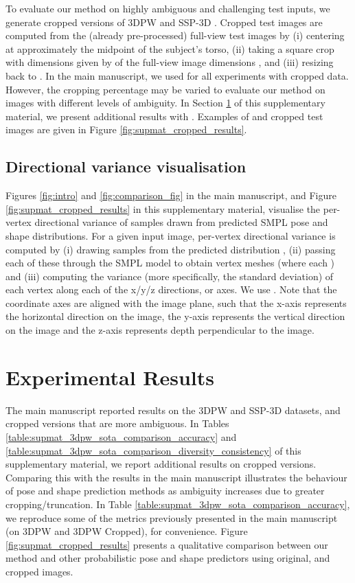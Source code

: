 To evaluate our method on highly ambiguous and challenging test inputs, we generate cropped versions of 3DPW \cite{vonMarcard2018} and SSP-3D \cite{STRAPS2020BMVC}. Cropped test images are computed from the (already pre-processed) full-view test images by (i) centering at approximately the midpoint of the subject's torso, (ii) taking a square crop with dimensions given by  of the full-view image dimensions , and (iii) resizing back to . In the main manuscript, we used  for all experiments with cropped data. However, the cropping percentage may be varied to evaluate our method on images with different levels of ambiguity. In Section \ref{sec:supmat_experiments} of this supplementary material, we present additional results with . Examples of  and  cropped test images are given in Figure \ref{fig:supmat_cropped_results}.

\subsection{Directional variance visualisation}

Figures \ref{fig:intro} and \ref{fig:comparison_fig} in the main manuscript, and Figure \ref{fig:supmat_cropped_results} in this supplementary material, visualise the per-vertex directional variance of samples drawn from predicted SMPL pose and shape distributions. For a given input image, per-vertex directional variance is computed by (i) drawing  samples from the predicted distribution , (ii) passing each of these through the SMPL \cite{SMPL:2015} model to obtain  vertex meshes  (where each ) and (iii) computing the variance (more specifically, the standard deviation) of each vertex along each of the x/y/z directions, or axes. We use . Note that the coordinate axes are aligned with the image plane, such that the x-axis represents the horizontal direction on the image, the y-axis represents the vertical direction on the image and the z-axis represents depth perpendicular to the image.


\section{Experimental Results}
\label{sec:supmat_experiments}

 The main manuscript reported results on the 3DPW \cite{vonMarcard2018} and SSP-3D \cite{STRAPS2020BMVC} datasets, and  cropped versions that are more ambiguous. In Tables \ref{table:supmat_3dpw_sota_comparison_accuracy} and \ref{table:supmat_3dpw_sota_comparison_diversity_consistency} of this supplementary material, we report additional results on  cropped versions. Comparing this with the results in the main manuscript illustrates the behaviour of pose and shape prediction methods as ambiguity increases due to greater cropping/truncation. In Table \ref{table:supmat_3dpw_sota_comparison_accuracy}, we reproduce some of the metrics previously presented in the main manuscript (on 3DPW and 3DPW  Cropped), for convenience. Figure \ref{fig:supmat_cropped_results} presents a qualitative comparison between our method and other probabilistic pose and shape predictors using original,  and  cropped images.



